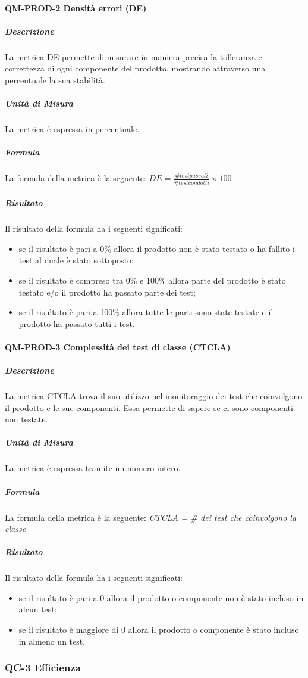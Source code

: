 		\paragraph{ QM-PROD-2 Densità errori (DE)}
			\subparagraph{Descrizione}
				La metrica DE permette di misurare in maniera precisa la tolleranza e correttezza di ogni componente del prodotto, mostrando attraverso una percentuale la sua stabilità.
			\subparagraph{Unità di Misura}
				La metrica è espressa in percentuale.
			\subparagraph{Formula}
				La formula della metrica è la seguente:
				\(DE = \frac{\# test passati}{\# test condotti}\times100\)
			\subparagraph{Risultato}
				Il risultato della formula ha i seguenti significati:
				\begin{itemize}
					\item se il risultato è pari a 0\% allora il prodotto non è stato testato o ha fallito i test al quale è stato sottoposto;
					\item se il risultato è compreso tra 0\% e 100\% allora parte del prodotto è stato testato e/o il prodotto ha passato parte dei test;
					\item se il risultato è pari a 100\% allora tutte le parti sono state testate e il prodotto ha passato tutti i test.
				\end{itemize}
		\paragraph{QM-PROD-3 Complessità dei test di classe (CTCLA)}
			\subparagraph{Descrizione}
				La metrica CTCLA trova il suo utilizzo nel monitoraggio dei test che coinvolgono il prodotto e le sue componenti. Essa permette di sapere se ci sono componenti non testate.
			\subparagraph{Unità di Misura}
				La metrica è espressa tramite un numero intero.
			\subparagraph{Formula}
				La formula della metrica è la seguente:
				\textit{CTCLA = \# dei test che coinvolgono la classe}
			\subparagraph{Risultato}
				Il risultato della formula ha i seguenti significati:
				\begin{itemize}
					\item se il risultato è pari a 0 allora il prodotto o componente non è stato incluso in alcun test;
					\item se il risultato è maggiore di 0 allora il prodotto o componente è stato incluso in almeno un test.
				\end{itemize}

	\subsubsection{QC-3 Efficienza}

